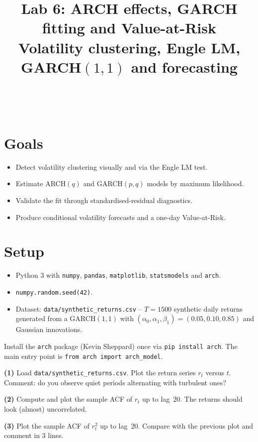 \documentclass[a4paper,11pt]{article}
\title{Lab 6: ARCH effects, GARCH fitting and Value-at-Risk\\
\large Volatility clustering, Engle LM, GARCH$(1,1)$ and forecasting}
\author{\auteurNom\\\auteurEmail\\\auteurInstitution}
\date{\anneeUniversitaire}
\begin{document}
\maketitle

\section*{Goals}
\begin{itemize}
  \item Detect volatility clustering visually and via the Engle LM
        test.
  \item Estimate ARCH$(q)$ and GARCH$(p, q)$ models by maximum
        likelihood.
  \item Validate the fit through standardised-residual diagnostics.
  \item Produce conditional volatility forecasts and a one-day
        Value-at-Risk.
\end{itemize}

\section*{Setup}
\begin{itemize}
  \item Python 3 with \texttt{numpy}, \texttt{pandas},
        \texttt{matplotlib}, \texttt{statsmodels} and
        \texttt{arch}.
  \item \texttt{numpy.random.seed(42)}.
  \item Dataset: \texttt{data/synthetic\_returns.csv} -- $T = 1500$
        synthetic daily returns generated from a GARCH$(1, 1)$ with
        $(\alpha_0, \alpha_1, \beta_1) = (0.05, 0.10, 0.85)$ and
        Gaussian innovations.
\end{itemize}

\begin{warning}
Install the \texttt{arch} package (Kevin Sheppard) once via
\texttt{pip install arch}. The main entry point is
\texttt{from arch import arch\_model}.
\end{warning}

\begin{exercise}
\textbf{(1)} Load \texttt{data/synthetic\_returns.csv}. Plot the
return series $r_t$ versus $t$. Comment: do you observe quiet
periods alternating with turbulent ones?

\textbf{(2)} Compute and plot the sample ACF of $r_t$ up to
lag~$20$. The returns should look (almost) uncorrelated.

\textbf{(3)} Plot the sample ACF of $r_t^2$ up to lag~$20$. Compare
with the previous plot and comment in 3 lines.
\end{exercise}
\end{document}
